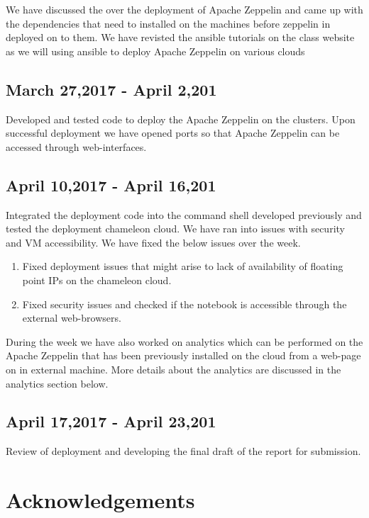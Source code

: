 \documentclass[9pt,twocolumn,twoside]{../../styles/osajnl}
\begin{document}
	We have discussed the over the deployment of Apache Zeppelin and 
	came 
	up with the dependencies that need to installed on the machines 
	before zeppelin in deployed on to them. We have revisted the 
	ansible 
	tutorials on the class website as we will using ansible to deploy 
	Apache Zeppelin on various clouds
	
	\subsection{March 27,2017 - April 2,201}
	
	Developed and tested code to deploy the Apache Zeppelin on the 
	clusters. Upon successful deployment we have opened ports so that 
	Apache Zeppelin can be accessed through web-interfaces.
	
	\subsection{April 10,2017 - April 16,201}
	
	Integrated the deployment code into the command shell developed 
	previously and tested the deployment chameleon cloud. We have ran 
	into issues with security and VM accessibility. We have fixed the 
	below issues over the week.
	\begin{enumerate}
		\item Fixed deployment issues that might arise to lack of 
		availability of  floating point IPs on the chameleon cloud. 
		\item Fixed security issues and checked if the notebook is 
		accessible through the external web-browsers.
	\end{enumerate}
	
	During the week we have also worked on analytics which can be 
	performed on the Apache Zeppelin that has been previously 
	installed 
	on the cloud from a web-page on in external machine. More details 
	about the analytics are discussed in the analytics section below.
	
	\subsection{April 17,2017 - April 23,201}
	
	Review of deployment and developing the final draft of the report 
	for 
	submission.
	
	\section*{Acknowledgements}
	
\end{document}

